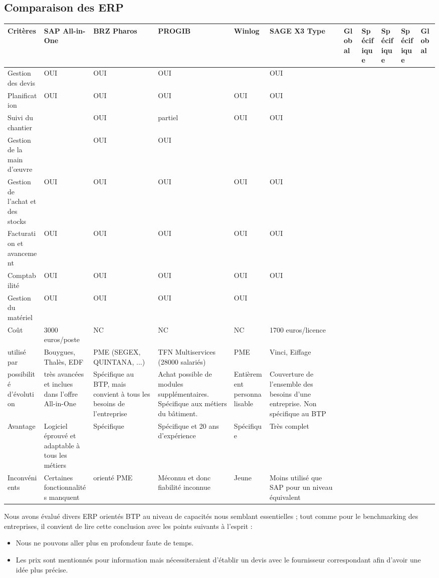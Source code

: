 \pagebreak
\subsection{Comparaison des ERP}

\hskip -15mm
\begin{longtable}{|m{2cm}|m{25mm}|m{25mm}|m{25mm}|m{25mm}|m{25mm}|}
\hline
Critères&SAP All-in-One&BRZ Pharos&PROGIB&Winlog&SAGE X3\endhead
\hline
Type&Global&Spécifique&Spécifique&Spécifique&Global\\
\hline
Gestion des devis&OUI&OUI&OUI&&OUI\\
\hline
Planification &OUI&OUI&OUI&OUI&OUI\\
\hline
Suivi du chantier&&OUI&partiel&OUI&OUI\\
\hline
Gestion de la main d’œuvre&&OUI&OUI&&\\
\hline
Gestion de l’achat et des stocks&OUI&OUI&OUI&OUI&OUI\\
\hline
Facturation et avancement&OUI&OUI&OUI&OUI&OUI\\
\hline
Comptabilité&OUI&OUI&OUI&OUI&OUI\\
\hline
Gestion du matériel&OUI&OUI&OUI&OUI&\\
\hline
Coût&3000 euros/poste&NC&NC&NC&1700 euros/licence\\
\hline
utilisé par&Bouygues, Thalès, EDF&PME (SEGEX, QUINTANA, ...)
&TFN Multiservices (28000 salariés)&PME&Vinci, Eiffage\\
\hline
possibilité d'évolution&très avancées et inclues dans l'offre All-in-One
&Spécifique au BTP, mais convient à tous les besoins de l'entreprise
&Achat possible de modules supplémentaires.
Spécifique aux métiers du bâtiment.
&Entièrement personnalisable&Couverture de l'ensemble des besoins
d'une entreprise. Non spécifique au BTP\\
\hline
Avantage&Logiciel éprouvé et adaptable à tous les métiers&Spécifique
&Spécifique et 20 ans d'expérience&Spécifique&Très complet\\
\hline
Inconvénients&Certaines fonctionnalités manquent&orienté PME
&Méconnu et donc fiabilité inconnue&Jeune
&Moins utilisé que SAP pour un niveau équivalent\\
\hline
\end{longtable}
\vfil
Nous avons évalué divers ERP orientés BTP au niveau de capacités nous
semblant essentielles ; tout comme pour le benchmarking des entreprises, il
convient de lire cette conclusion avec les points suivants à l'esprit :

\begin{itemize}
\item Nous ne pouvons aller plus en profondeur faute de temps.
\item Les prix sont mentionnés pour information mais nécessiteraient
d'établir un devis avec le fournisseur correspondant afin d'avoir une idée
plus précise.
\end{itemize}

